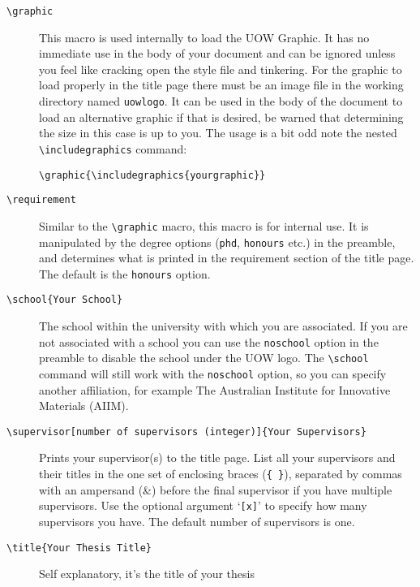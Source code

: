 \documentclass[12pt,oneside]{article}
\newcommand{\oporcom}[1]{\texttt{\color{RoyalBlue}#1}} %
\newcommand{\comoptions}[1]{\texttt{\color{Gray}#1}} %
\begin{document}
\begin{description}
    \item[\oporcom{\textbackslash{}graphic}]
    This macro is used internally to load the UOW Graphic. It has no immediate use in the body of your document and can be ignored unless you feel like cracking open the style file and tinkering. For the graphic to load properly in the title page there must be an image file in the working directory named \texttt{uow\textunderscore{}logo}. It can be used in the body of the document to load an alternative graphic if that is desired, be warned that determining the size in this case is up to you.
    The usage is a bit odd note the nested \oporcom{\textbackslash{}includegraphics} command:
    
    \oporcom{\textbackslash{}graphic}\comoptions{\{\textbackslash{}includegraphics\{yourgraphic\}\}}
    
    \item[\oporcom{\textbackslash{}requirement}]
    Similar to the \oporcom{\textbackslash{}graphic} macro, this macro is for internal use. It is manipulated by the degree options (\oporcom{phd}, \oporcom{honours} etc.) in the preamble, and determines what is printed in the requirement section of the title page. The default is the \oporcom{honours} option.
    
    \item[\oporcom{\textbackslash{}school}\comoptions{\{Your School\}}]
    The school within the university with which you are associated. If you are not associated with a school you can use the \oporcom{noschool} option in the preamble to disable the school under the UOW logo. The \oporcom{\textbackslash{}school} command will still work with the \oporcom{noschool} option, so you can specify another affiliation, for example The Australian Institute for Innovative Materials (AIIM).
    
    \item[\oporcom{\textbackslash{}supervisor}\comoptions{[number of supervisors (integer)]\{Your Supervisors\}}]
    Prints your supervisor(s) to the title page. List all your supervisors and their titles in the one set of enclosing braces (\texttt{\{ \}}), separated by commas with an ampersand (\&) before the final supervisor if you have multiple supervisors. Use the optional argument `\texttt{[x]}' to specify how many supervisors you have. The default number of supervisors is one.
    
    \item[\oporcom{\textbackslash{}title}\comoptions{\{Your Thesis Title\}}]
    Self explanatory, it's the title of your thesis
\end{description}
\end{document}
